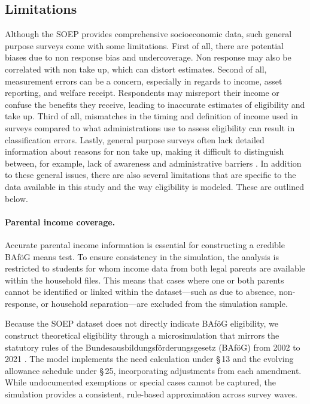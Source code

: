 \subsection{Limitations}

Although the SOEP provides comprehensive socioeconomic data, such general purpose surveys come with some limitations. First of all, there are potential biases due to non response bias and undercoverage. Non response may also be correlated with non take up, which can distort estimates. Second of all, measurement errors can be a concern, especially in regards to income, asset reporting, and welfare receipt. Respondents may misreport their income or confuse the benefits they receive, leading to inaccurate estimates of eligibility and take up. Third of all, mismatches in the timing and definition of income used in surveys compared to what administrations use to assess eligibility can result in classification errors. Lastly, general purpose surveys often lack detailed information about reasons for non take up, making it difficult to distinguish between, for example, lack of awareness and administrative barriers \citep{mechelen_who_2017}. In addition to these general issues, there are also several limitations that are specific to the data available in this study and the way eligibility is modeled. These are outlined below.

\paragraph{Parental income coverage.} %
Accurate parental income information is essential for constructing a credible BAföG means test. 
To ensure consistency in the simulation, the analysis is restricted to students for whom income data from both legal parents are available within the household files. 
This means that cases where one or both parents cannot be identified or linked within the dataset—such as due to absence, non-response, or household separation—are excluded from the simulation sample.

Because the SOEP dataset does not directly indicate BAföG eligibility, we construct theoretical eligibility through a microsimulation that mirrors the statutory rules of the Bundesausbildungsförderungsgesetz (BAföG) from 2002 to 2021 \citep{bafoeg_law,bafoeg20,bafoeg21,bafoeg22,bafoeg23,bafoeg24,bafoeg25,bafoeg26,bafoeg27,bafoeg28,bafoeg29}. 
The model implements the need calculation under §\,13 and the evolving allowance schedule under §\,25, incorporating adjustments from each amendment. 
While undocumented exemptions or special cases cannot be captured, the simulation provides a consistent, rule-based approximation across survey waves.

